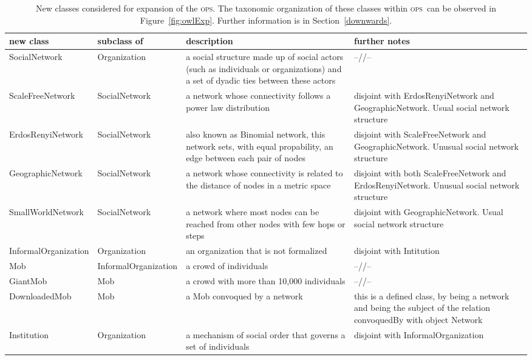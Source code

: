 \documentclass[10pt,letterpaper]{article}
\newcommand{\ops}{\textsc{ops}}
\begin{document}
\begin{table}[!h]
\begin{adjustwidth}{-2.25in}{0in} %
  \centering
  \caption{New classes considered for expansion of the \ops. The taxonomic organization of these classes within \ops\ can be observed in Figure~\ref{fig:owlExp}. Further information is in Section~\ref{downwards}.}
  \begin{tabular}{|l|l|p{5.4cm}|p{5.3cm}|}\hline
{\bf new class} & {\bf subclass of} & {\bf description} & {\bf further notes} \\\hline\hline
SocialNetwork & Organization & a social structure made up of social actors (such as individuals or organizations) and a set of dyadic ties between these actors & --//--\\\hline
ScaleFreeNetwork & SocialNetwork & a network whose connectivity follows a power law distribution & disjoint with ErdosRenyiNetwork and GeographicNetwork. Usual social network structure \\ \hline
ErdosRenyiNetwork & SocialNetwork & also known as Binomial network, this network sets, with equal propability, an edge between each pair of nodes & disjoint with ScaleFreeNetwork and GeographicNetwork. Unusual social network structure \\\hline
GeographicNetwork & SocialNetwork & a network whose connectivity is related to the distance of nodes in a metric space & disjoint with both ScaleFreeNetwork and ErdosRenyiNetwork. Unusual social network structure \\\hline
SmallWorldNetwork & SocialNetwork & a network where most nodes can be reached from other nodes with few hops or steps & disjoint with GeographicNetwork. Usual social network structure \\\hline\hline
InformalOrganization & Organization & an organization that is not formalized & disjoint with Intitution \\ \hline
Mob & InformalOrganization & a crowd of individuals & --//-- \\\hline
GiantMob & Mob & a crowd with more than 10,000 individuals & --//--\\\hline
DownloadedMob & Mob & a Mob convoqued by a network & this is a defined class, by being a network and being the subject of the relation convoquedBy with object Network \\ \hline\hline
Institution & Organization & a mechanism of social order that governs a set of individuals & disjoint with InformalOrganization \\\hline

\end{tabular}
\end{adjustwidth}
\end{table}
\end{document}
